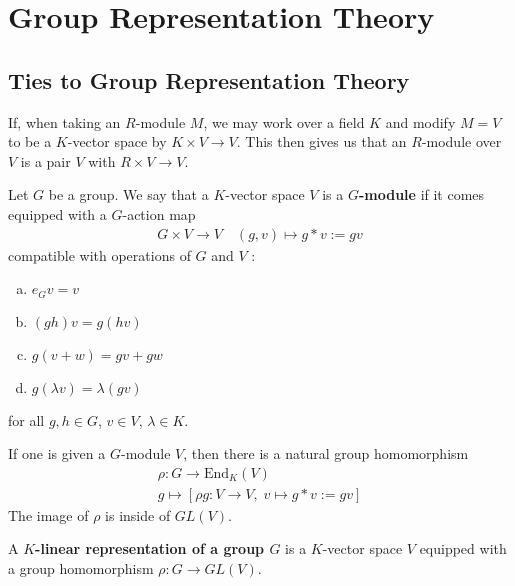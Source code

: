 \documentclass{memoir}
\begin{document}


\chapter{Group Representation Theory}
\label{cha:group_representation_theory}

\section{Ties to Group Representation Theory}
\label{sec:ties_to_group_representation_theory}

If, when taking an \(R\)-module \(M\), we may work over a field \(K\) and modify \(M = V\) to be a \(K\)-vector space by \(K\times V\to V\). This then gives us that an \(R\)-module over \(V\) is a pair \(V\) with \(R\times V\to V\).

\begin{defn}
	Let \(G\) be a group. We say that a \(K\)-vector space \(V\) is a \textbf{\(G\)-module} if it comes equipped with a \(G\)-action map
	\begin{align*}
		G\times V \to V \quad (g,v) \mapsto g*v :=gv
	\end{align*}
	compatible with operations of \(G\) and \(V\) :
	\begin{enumerate}[(a).]
		\item \(e_G v = v\) 
		\item \((gh)v = g(hv)\) 
		\item \(g(v+w) = gv + gw\) 
		\item \(g(\lambda v) = \lambda (gv)\)
	\end{enumerate}
	for all \(g,h \in G\), \(v \in V\), \(\lambda \in K\).
\end{defn}
If one is given a \(G\)-module \(V\), then there is a natural group homomorphism
\begin{align*}
	\rho:G\to \textrm{End}_K(V)\\
	g\mapsto \left[ \rho g : V \to V , \; v\mapsto g * v := gv \right] 
\end{align*}
The image of \(\rho\) is inside of \(GL(V)\).

\begin{defn}
	A \textbf{\(K\)-linear representation of a group \(G\)} is a \(K\)-vector space \(V\) equipped with a group homomorphism \(\rho:G \to GL(V)\).
\end{defn}
\end{document}
